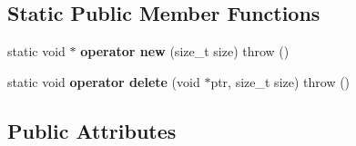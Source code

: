 \subsection*{Static Public Member Functions}
\begin{DoxyCompactItemize}
\item 
\mbox{\label{classsp__head_afc4dcd258833ce64ce703a9a3bd9b322}} 
static void $\ast$ {\bfseries operator new} (size\+\_\+t size)  throw ()
\item 
\mbox{\label{classsp__head_a53a295f7132b0b3a13c24cb503531464}} 
static void {\bfseries operator delete} (void $\ast$ptr, size\+\_\+t size)  throw ()
\end{DoxyCompactItemize}
\subsection*{Public Attributes}
